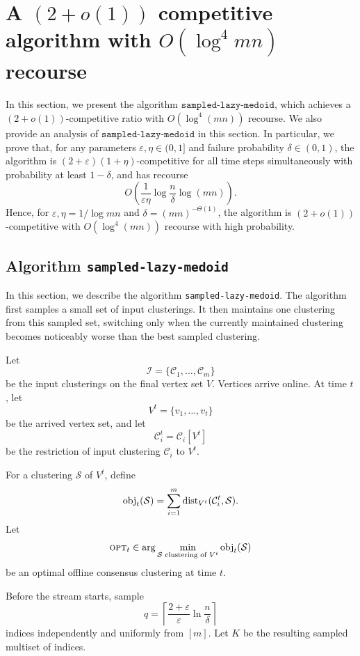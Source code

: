 \section{A $(2 + o(1))$ competitive algorithm with $O(\log^4 mn)$ recourse}

In this section, we present the algorithm \(\texttt{sampled-lazy-medoid}\), which achieves a \((2+o(1))\)-competitive ratio with \(O(\log^4(mn))\) recourse. We also provide an analysis of \(\texttt{sampled-lazy-medoid}\) in this section. In particular, we prove that, for any parameters \(\varepsilon,\eta\in(0,1]\) and failure probability \(\delta\in(0,1)\), the algorithm is \((2+\varepsilon)(1+\eta)\)-competitive for all time steps simultaneously with probability at least \(1-\delta\), and has recourse
\[
    O\left(
        \frac{1}{\varepsilon\eta}
        \log\frac{n}{\delta}
        \log(mn)
    \right).
\]
Hence, for \(\varepsilon,\eta = 1/\log mn\) and \(\delta=(mn)^{-\Theta(1)}\), the algorithm is $(2 + o(1))$-competitive with \(O(\log^4(mn))\) recourse with high probability.

\lazymedoid*

\subsection{Algorithm \texttt{sampled-lazy-medoid}}

In this section, we describe the algorithm \texttt{sampled-lazy-medoid}. The algorithm first samples a small set of input clusterings. It then maintains one clustering from this sampled set, switching only when the currently maintained clustering becomes noticeably worse than the best sampled clustering.

Let
\[
    \mathcal I=\{\mathcal C_1,\ldots,\mathcal C_m\}
\]
be the input clusterings on the final vertex set \(V\). Vertices arrive online. At time \(t\), let
\[
    V^t=\{v_1,\ldots,v_t\}
\]
be the arrived vertex set, and let
\[
    \mathcal C_i^t=\mathcal C_i[V^t]
\]
be the restriction of input clustering \(\mathcal C_i\) to \(V^t\).

For a clustering \(\mathcal S\) of \(V^t\), define
\[
    \text{obj}_t(\mathcal S)
    =
    \sum_{i=1}^m
    \text{dist}_{V^t}(\mathcal C_i^t,\mathcal S).
\]
Let
\[
    \textsc{opt}_t
    \in
    \arg\min_{\mathcal S\text{ clustering of }V^t}
    \text{obj}_t(\mathcal S)
\]
be an optimal offline consensus clustering at time \(t\).

Before the stream starts, sample
\[
    q
    =
    \left\lceil
        \frac{2+\varepsilon}{\varepsilon}
        \ln\frac{n}{\delta}
    \right\rceil
\]
indices independently and uniformly from \([m]\). Let \(K\) be the resulting sampled multiset of indices.

